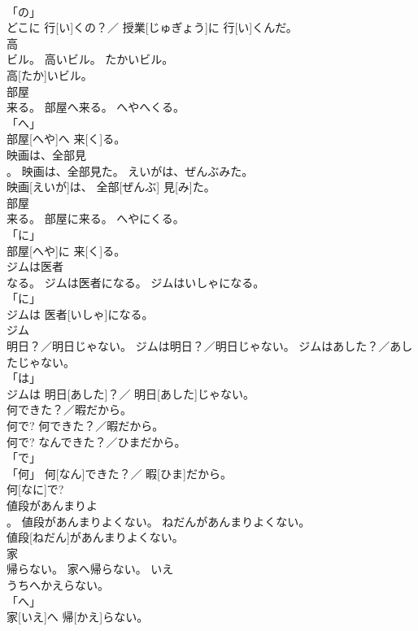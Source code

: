 \documentclass[8pt]{extreport}
\begin{document}
\begin{CJK}{UTF8}{min}
\\	「の」 
\\	どこに 行[い]くの？／ 授業[じゅぎょう]に 行[い]くんだ。		
\\	高
\\	ビル。	高いビル。	たかいビル。	
\\	高[たか]いビル。		
\\	部屋
\\	来る。	部屋へ来る。	へやへくる。	
\\	「へ」 
\\	部屋[へや]へ 来[く]る。		
\\	映画は、全部見
\\	。	映画は、全部見た。	えいがは、ぜんぶみた。	
\\	映画[えいが]は、 全部[ぜんぶ] 見[み]た。		
\\	部屋
\\	来る。	部屋に来る。	へやにくる。	
\\	「に」 
\\	部屋[へや]に 来[く]る。		
\\	ジムは医者
\\	なる。	ジムは医者になる。	ジムはいしゃになる。	
\\	「に」 
\\	ジムは 医者[いしゃ]になる。		
\\	ジム
\\	明日？／明日じゃない。	ジムは明日？／明日じゃない。	ジムはあした？／あしたじゃない。	
\\	「は」 
\\	ジムは 明日[あした]？／ 明日[あした]じゃない。		
\\	何できた？／暇だから。
\\	何で?	何できた？／暇だから。
\\	何で?	なんできた？／ひまだから。	
\\	「で」 
\\	「何」	何[なん]できた？／ 暇[ひま]だから。 
\\	何[なに]で?		
\\	値段があんまりよ
\\	。	値段があんまりよくない。	ねだんがあんまりよくない。	
\\	値段[ねだん]があんまりよくない。		
\\	家
\\	帰らない。	家へ帰らない。	{いえ
\\	うち}へかえらない。	
\\	「へ」 
\\	家[いえ]へ 帰[かえ]らない。		

\end{CJK}
\end{document}
